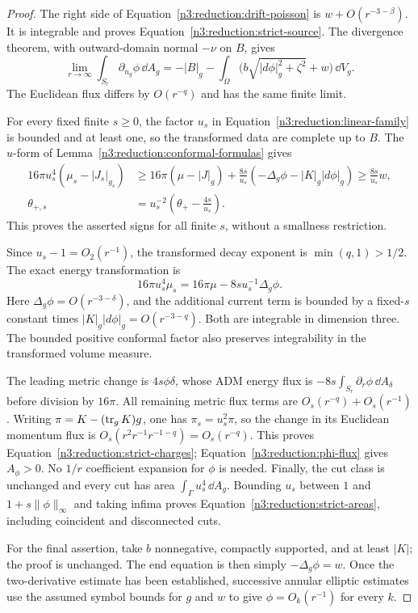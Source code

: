 \begin{proof}
The right side of Equation~\eqref{n3:reduction:drift-poisson} is
$w+O(r^{-3-\beta})$.  It is integrable and proves
Equation~\eqref{n3:reduction:strict-source}.  The divergence theorem, with
outward-domain normal $-\nu$ on $B$, gives
\begin{equation}
 \label{n3:reduction:phi-flux}
 \lim_{r\to\infty}\int_{S_r}\partial_{n_g}\phi\,\dd A_g
 =-|B|_g-\int_{\Omega}
       \bigl(b\sqrt{|d\phi|_g^2+\zeta^2}+w\bigr)\,\dd V_g.
\end{equation}
The Euclidean flux differs by $O(r^{-q})$ and has the same finite limit.

For every fixed finite $s\ge0$, the factor $u_s$ in
Equation~\eqref{n3:reduction:linear-family} is bounded and at least one,
so the transformed data are complete up to $B$.
The $u$-form of Lemma~\ref{n3:reduction:conformal-formulas} gives
\begin{align*}
 16\pi u_s^4(\mu_s-|J_s|_{g_s})
 &\ge16\pi(\mu-|J|_g)
        +\frac{8s}{u_s}(-\Delta_g\phi-|K|_g|d\phi|_g)
 \ge \frac{8s}{u_s}w,\\
 \theta_{+,s}
 &=u_s^{-2}\left(\theta_+-\frac{4s}{u_s}\right).
\end{align*}
This proves the asserted signs for all finite $s$, without a smallness
restriction.

Since $u_s-1=O_2(r^{-1})$, the transformed decay exponent is
$\min(q,1)>1/2$.  The exact energy transformation is
\[
 16\pi u_s^4\mu_s=16\pi\mu-8s u_s^{-1}\Delta_g\phi.
\]
Here $\Delta_g\phi=O(r^{-3-\delta})$, and the additional current term
is bounded by a fixed-$s$ constant times
$|K|_g|d\phi|_g=O(r^{-3-q})$.  Both are integrable in dimension three.
The bounded positive conformal factor also preserves integrability in
the transformed volume measure.

The leading metric change is $4s\phi\delta$, whose ADM energy flux
is $-8s\int_{S_r}\partial_r\phi\,\dd A_\delta$ before division by
$16\pi$.  All remaining metric flux terms are
$O_s(r^{-q})+O_s(r^{-1})$.  Writing $\pi=K-(\operatorname{tr}_gK)g$, one has
$\pi_s=u_s^2\pi$, so the change in its Euclidean momentum flux is
$O_s(r^2r^{-1}r^{-1-q})=O_s(r^{-q})$.
This proves Equation~\eqref{n3:reduction:strict-charges};
Equation~\eqref{n3:reduction:phi-flux} gives $A_\phi>0$.
No $1/r$ coefficient expansion for $\phi$ is needed.
Finally, the cut class is unchanged and every cut has area
$\int_\Gamma u_s^4\,\dd A_g$.  Bounding $u_s$ between $1$ and
$1+s\|\phi\|_\infty$ and taking infima proves
Equation~\eqref{n3:reduction:strict-areas}, including coincident and
disconnected cuts.

For the final assertion, take $b$ nonnegative, compactly supported, and
at least $|K|$; the proof is unchanged.  The end equation is then simply
$-\Delta_g\phi=w$.  Once the two-derivative estimate has been established,
successive annular elliptic estimates use the assumed symbol bounds for
$g$ and $w$ to give $\phi=O_k(r^{-1})$ for every $k$.
\end{proof}

